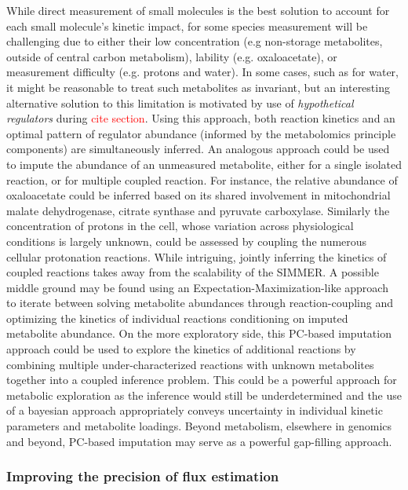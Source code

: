 While direct measurement of small molecules is the best solution to account for each small molecule's kinetic impact, for some species measurement will be challenging due to either their low concentration (e.g non-storage metabolites, outside of central carbon metabolism), lability (e.g. oxaloacetate), or measurement difficulty (e.g. protons and water). In some cases, such as for water, it might be reasonable to treat such metabolites as invariant, but an interesting alternative solution to this limitation is motivated by use of \textit{hypothetical regulators} during \textcolor{red}{cite section}.  Using this approach, both reaction kinetics and an optimal pattern of regulator abundance (informed by the metabolomics principle components) are simultaneously inferred. An analogous approach could be used to impute the abundance of an unmeasured metabolite, either for a single isolated reaction, or for multiple coupled reaction.  For instance, the relative abundance of oxaloacetate could be inferred based on its shared involvement in mitochondrial malate dehydrogenase, citrate synthase and pyruvate carboxylase. Similarly the concentration of protons in the cell, whose variation across physiological conditions is largely unknown, could be assessed by coupling the numerous cellular protonation reactions. While intriguing, jointly inferring the kinetics of coupled reactions takes away from the scalability of the SIMMER. A possible middle ground may be found using an Expectation-Maximization-like approach to iterate between solving metabolite abundances through reaction-coupling and optimizing the kinetics of individual reactions conditioning on imputed metabolite abundance. On the more exploratory side, this PC-based imputation approach could be used to explore the kinetics of additional reactions by combining multiple under-characterized reactions with unknown metabolites together into a coupled inference problem. This could be a powerful approach for metabolic exploration as the inference would still be underdetermined and the use of a bayesian approach appropriately conveys uncertainty in individual kinetic parameters and metabolite loadings. Beyond metabolism, elsewhere in genomics and beyond, PC-based imputation may serve as a powerful gap-filling approach.

\subsubsection{Improving the precision of flux estimation}

